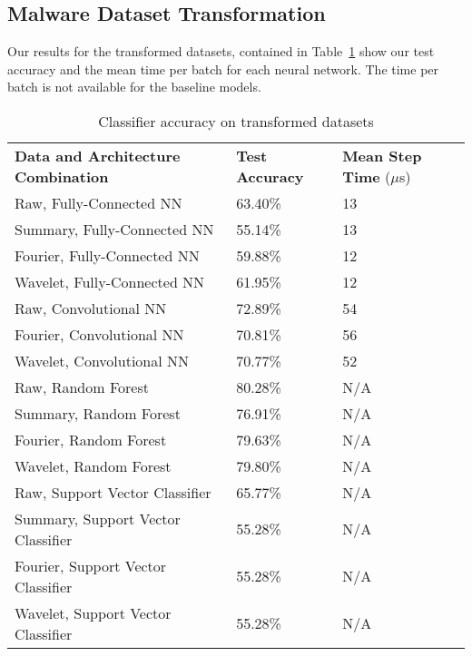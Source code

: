 \subsection{Malware Dataset Transformation}
Our results for the transformed datasets, contained in Table~\ref{Tab:malware_test} show our test accuracy and the mean time per batch for each neural network.
The time per batch is not available for the baseline models.

\begin{table}[h]
\centering	
\begin{tabular}{l|ll}
\textbf{Data and Architecture Combination} & \textbf{Test Accuracy} & \textbf{Mean Step Time} ($\mu$s) \\\cline{1-3}
Raw, Fully-Connected NN            & 63.40\%         & 13\\
Summary, Fully-Connected NN        & 55.14\%         & 13\\
Fourier, Fully-Connected NN        & 59.88\%         & 12\\
Wavelet, Fully-Connected NN        & 61.95\%         & 12\\
\hline
Raw, Convolutional NN              & 72.89\%         & 54\\
Fourier, Convolutional NN          & 70.81\%         & 56\\
Wavelet, Convolutional NN          & 70.77\%         & 52\\
\hline
Raw, Random Forest                 & 80.28\%         & N/A\\ 
Summary, Random Forest             & 76.91\%         & N/A\\
Fourier, Random Forest             & 79.63\%         & N/A\\
Wavelet, Random Forest             & 79.80\%         & N/A\\
\hline
Raw, Support Vector Classifier     & 65.77\%         & N/A\\    
Summary, Support Vector Classifier & 55.28\%         & N/A\\  
Fourier, Support Vector Classifier & 55.28\%         & N/A\\  
Wavelet, Support Vector Classifier & 55.28\%         & N/A           
\end{tabular}
\caption{Classifier accuracy on transformed datasets}
\label{Tab:malware_test}
\end{table}


